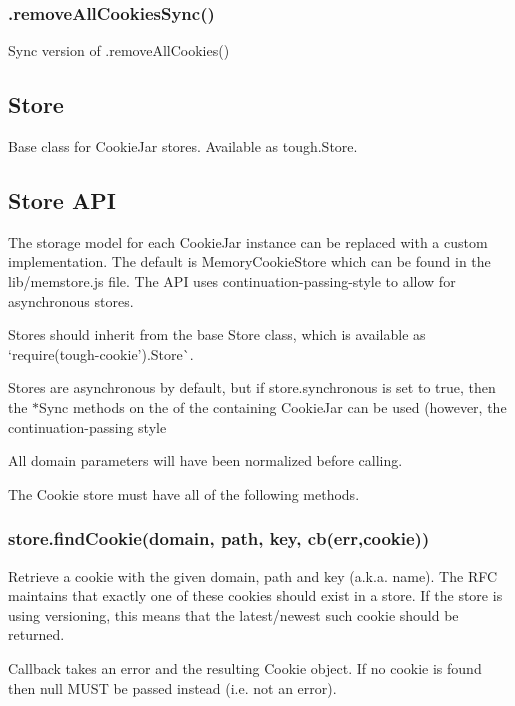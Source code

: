 \subsubsection*{{\ttfamily .remove\+All\+Cookies\+Sync()}}

Sync version of {\ttfamily .remove\+All\+Cookies()}

\subsection*{Store}

Base class for Cookie\+Jar stores. Available as {\ttfamily tough.\+Store}.

\subsection*{Store A\+PI}

The storage model for each {\ttfamily Cookie\+Jar} instance can be replaced with a custom implementation. The default is {\ttfamily Memory\+Cookie\+Store} which can be found in the {\ttfamily lib/memstore.\+js} file. The A\+PI uses continuation-\/passing-\/style to allow for asynchronous stores.

Stores should inherit from the base {\ttfamily Store} class, which is available as `require(\textquotesingle{}tough-\/cookie').Store\`{}.

Stores are asynchronous by default, but if {\ttfamily store.\+synchronous} is set to {\ttfamily true}, then the {\ttfamily $\ast$\+Sync} methods on the of the containing {\ttfamily Cookie\+Jar} can be used (however, the continuation-\/passing style

All {\ttfamily domain} parameters will have been normalized before calling.

The Cookie store must have all of the following methods.

\subsubsection*{{\ttfamily store.\+find\+Cookie(domain, path, key, cb(err,cookie))}}

Retrieve a cookie with the given domain, path and key (a.\+k.\+a. name). The R\+FC maintains that exactly one of these cookies should exist in a store. If the store is using versioning, this means that the latest/newest such cookie should be returned.

Callback takes an error and the resulting {\ttfamily Cookie} object. If no cookie is found then {\ttfamily null} M\+U\+ST be passed instead (i.\+e. not an error).

